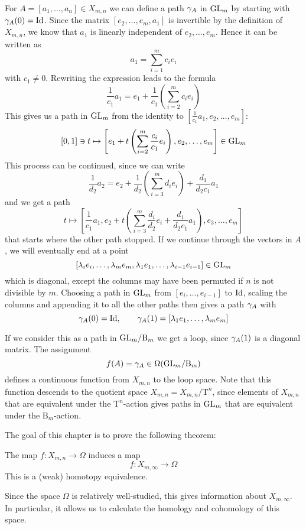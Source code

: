 For $A = [a_1,\dots,a_n]\in X_{m,n}$ we
can define a path $ \gamma_A$ in $\mathrm{GL}_m$ by starting with
$\gamma_A(0) = \operatorname{Id}$. Since the matrix $[e_2,\dots,e_m,a_1]$ is
invertible by the definition of $X_{m,n}$, we know that $a_1$ is linearly
independent of $e_2,\dots,e_m$. Hence it can be written as
\[ a_1 = \sum_{i=1}^m c_i e_i \]
with $c_1 \neq 0$. Rewriting the expression leads to the formula
\[  \frac{1}{c_1} a_1= e_1 + \frac{1}{c_1} \left(\sum_{i=2}^m c_i
  e_i\right) \]
This gives us a path in $\mathrm{GL}_m$ from the identity to
$\left[\frac{1}{c_1} a_1,e_2,\dots,e_m\right]$:
\[ [0,1]\ni t \mapsto \left[ e_1 + t\left(\sum_{i=2}^m
    \frac{c_i}{c_1}e_i\right),e_2,\dots,e_m \right] \in \mathrm{GL}_m \]
This process can be continued, since we can write
\[ \frac{1}{d_2}a_2 = e_2 + \frac{1}{d_2}\left(\sum_{i=3}^m d_i
  e_i\right) + \frac{d_1}{d_2c_1}a_1 \]
and we get a path
\[ t\mapsto \left[\frac{1}{c_1}a_1,e_2+t\left(\sum_{i=3}^m
    \frac{d_i}{d_2}e_i +
    \frac{d_1}{d_2c_1}a_1\right),e_3,\dots,e_m\right] \]
that starts where the other path stopped. If we continue through the
vectors in $A$, we will eventually end at a point
\[ [\lambda_i e_i,\dots,\lambda_me_m,\lambda_1e_1,\dots,\lambda_{i-1}e_{i-1}]\in \mathrm{GL}_m \]
which is diagonal, except the columns may have been
permuted if $n$ is not divisible by $m$. Choosing a path in $\mathrm{GL}_m$
from $[e_i,\dots,e_{i-1}]$ to $\operatorname{Id}$, scaling the columns and appending
it to all the other paths then gives a path $ \gamma_A$ with
\[  \gamma_A(0) = \operatorname{Id}, \qquad \gamma_A(1) =
[\lambda_1e_1,\dots,\lambda_me_m] \]

If we consider this as a path in $\mathrm{GL}_{m}/\mathrm{B}_{m}$ we
get a loop, since $\gamma_A(1)$ is a diagonal matrix. The
assignment
\[ f(A) = \gamma_A \in \Omega(\mathrm{GL}_{m}/\mathrm{B}_{m}) \]
defines a continuous function from $X_{m,n}$ to the loop space. Note that
this function descends to the quotient space $X_{m,n}=X_{m,n}/\mathrm{T}^n$, since
elements of $X_{m,n}$ that are equivalent under the $\mathrm{T}^n$-action gives
paths in $\mathrm{GL}_m$ that are equivalent under the $\mathrm{B}_m$-action.

The goal of this chapter is to prove the following theorem:

\begin{theorem}
  The map $f : X_{m,n} \to \Omega$ induces a map
  \[ f : X_{m,\infty} \to \Omega \]
  This is a (weak) homotopy equivalence.
\end{theorem}

Since the space $\Omega$ is relatively well-studied, this gives
information about $X_{m,\infty}$. In particular, it allows us to
calculate the homology and cohomology of this space.

